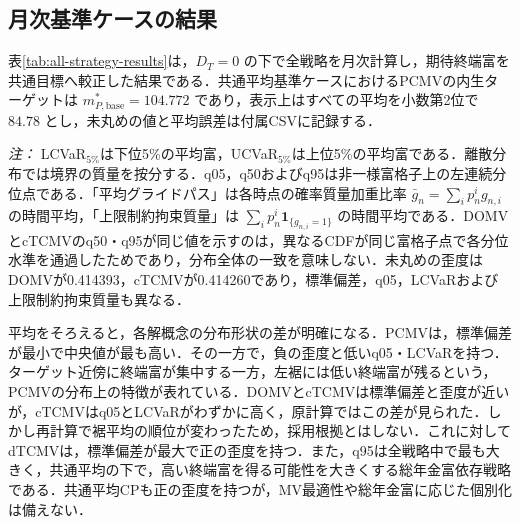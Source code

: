 \documentclass[10pt,a4paper]{article}
\theoremstyle{plain}
\theoremstyle{definition}
\begin{document}
\subsection{月次基準ケースの結果}
\label{sec:monthly-baseline-results}

表\ref{tab:all-strategy-results}は，$D_T=0$ の下で全戦略を月次計算し，期待終端富を共通目標へ較正した結果である．共通平均基準ケースにおけるPCMVの内生ターゲットは $m_{P,\mathrm{base}}^*=104.772$ であり，表示上はすべての平均を小数第2位で $84.78$ とし，未丸めの値と平均誤差は付属CSVに記録する．

\begin{table}[htbp]
\centering
\scriptsize
\caption{v5原計算の有限格子上の参考値：終端DC富と配分（$N_t=480$，151点）}
\label{tab:all-strategy-results}
\end{table}

\noindent\emph{注：} LCVaR$_{5\%}$は下位5\%の平均富，UCVaR$_{5\%}$は上位5\%の平均富である．離散分布では境界の質量を按分する．q05，q50およびq95は非一様富格子上の左連続分位点である．「平均グライドパス」は各時点の確率質量加重比率 $\bar g_n=\sum_i p_n^i g_{n,i}$ の時間平均，「上限制約拘束質量」は $\sum_i p_n^i\mathbf 1_{\{g_{n,i}=1\}}$ の時間平均である．DOMVとcTCMVのq50・q95が同じ値を示すのは，異なるCDFが同じ富格子点で各分位水準を通過したためであり，分布全体の一致を意味しない．未丸めの歪度はDOMVが0.414393，cTCMVが0.414260であり，標準偏差，q05，LCVaRおよび上限制約拘束質量も異なる．

平均をそろえると，各解概念の分布形状の差が明確になる．PCMVは，標準偏差が最小で中央値が最も高い．その一方で，負の歪度と低いq05・LCVaRを持つ．ターゲット近傍に終端富が集中する一方，左裾には低い終端富が残るという，PCMVの分布上の特徴が表れている．DOMVとcTCMVは標準偏差と歪度が近いが，cTCMVはq05とLCVaRがわずかに高く，原計算ではこの差が見られた．しかし再計算で裾平均の順位が変わったため，採用根拠とはしない．これに対してdTCMVは，標準偏差が最大で正の歪度を持つ．また，q95は全戦略中で最も大きく，共通平均の下で，高い終端富を得る可能性を大きくする総年金富依存戦略である．共通平均CPも正の歪度を持つが，MV最適性や総年金富に応じた個別化は備えない．
\end{document}
